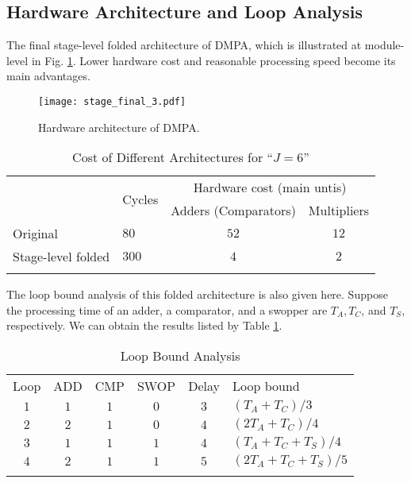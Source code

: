 \documentclass[journal,twoside]{IEEEtran}
\begin{document}
\subsection{Hardware Architecture and Loop Analysis}
The final stage-level folded architecture of DMPA, which is illustrated at module-level in Fig. \ref{fig:Final architecture of DMPA}.
Lower hardware cost and reasonable processing speed become its main advantages.
\begin{figure}[htbp]
\centering
\texttt{[image: stage\_final\_3.pdf]}
\caption{Hardware architecture of DMPA.}
\label{fig:Final architecture of DMPA}
\end{figure}

\begin{table}[htbp]
\centering
\renewcommand\arraystretch{1.2}
\footnotesize
\caption{Cost of Different Architectures for ``$J=6$''}
\begin{tabular}{llcc}
\Xhline{1.0pt}
\multirow{2}{*}{Different architectures} &\multirow{2}{*}{Cycles} &  \multicolumn{2}{c}{Hardware cost (main untis)}\\ \cline{3-4}
&   & Adders (Comparators)  & Multipliers\\
\Xhline{0.5pt}
\rowcolor{gray!15}Original & $80$ & $52$ & $12$\\
Stage-level folded & $300$ & $4$ & $2$\\
\Xhline{1.0pt}
\end{tabular}
\end{table}

The loop bound analysis \cite{chao1993iteration,ito1995determining} of this folded architecture is also given here. Suppose the processing time of an adder, a comparator, and a swopper are $T_{A}, T_{C}$, and $T_{S}$, respectively.
We can obtain the results listed by Table \ref{tab:loop bound analysis}.
\begin{table}[htbp]
\centering
\renewcommand\arraystretch{1.2}
\footnotesize
 \caption{Loop Bound Analysis}
 \label{tab:loop bound analysis}
 \begin{tabular}{cccccl}
\Xhline{1.0pt}
  Loop & ADD & CMP & SWOP & Delay & Loop bound\\
\Xhline{.5pt}
  \rowcolor{gray!15}$1$ & $1$ & $1$ & $0$ & $3$ & $(T_{A}+T_{C})/3$\\
  $2$ & $2$ & $1$ & $0$ & $4$ & $(2T_{A}+T_{C})/4$\\
  \rowcolor{gray!15}$3$ & $1$ & $1$ & $1$ & $4$ & $(T_{A}+T_{C}+T_{S})/4$\\
  $4$ & $2$ & $1$ & $1$ & $5$ & $(2T_{A}+T_{C}+T_{S})/5$\\
\Xhline{1.0pt}
 \end{tabular}
\end{table}
\end{document}
